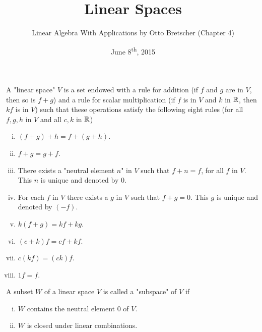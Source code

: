 \documentclass[a4paper,11pt]{article}
\title{Linear Spaces}
\author{Linear Algebra With Applications by Otto Bretscher (Chapter 4)}
\date{June 8\textsuperscript{th}, 2015}
\begin{document}
\maketitle
{}

\begin{outline}


    A "linear space" \(V\) is a set endowed with a rule for addition (if \(f\) and \(g\) are in \(V\), then so is 
    \(f + g\)) and a rule for scalar multiplication (if \(f\) is in \(V\) and \(k\) in \(\mathbb{R}\), then \(kf\) is in 
    \(V\)) such that these operations satisfy the following eight rules (for all \(f, g, h\) in \(V\) and all 
    \(c, k\) in \(\mathbb{R}\))
    \begin{enumerate}[i.]
      \item \((f + g) + h = f+ (g + h)\).
      \item \(f + g = g + f\).
      \item There exists a "neutral element \(n\)" in \(V\) such that \(f + n = f\), for all 
            \(f\) in \(V\). This \(n\) is unique and denoted by \(0\).
      \item For each \(f\) in \(V\) there exists a \(g\) in \(V\) such that \(f + g = 0\). This 
            \(g\) is unique and denoted by \((-f)\).
      \item \(k(f + g) = kf + kg\).
      \item \((c + k)f = cf + kf\).
      \item \(c(kf) = (ck)f\).
      \item \(1f = f\).
    \end{enumerate}
    
    A subset \(W\) of a linear space \(V\) is called a "subspace" of \(V\) if
    \begin{enumerate}[i.]
      \item \(W\) contains the neutral element \(0\) of \(V\).
      \item \(W\) is closed under linear combinations.
    \end{enumerate}
    

\end{outline}
\end{document}
